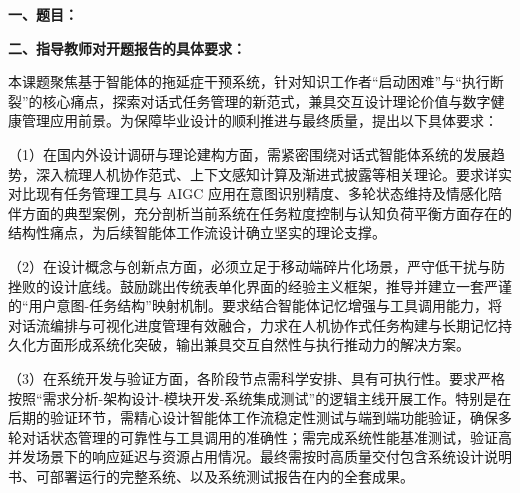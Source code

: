 {
    \setlength{\parindent}{0em}

    \par {\bfseries 一、题目：\uline{\hfill \Title \hfill}}

    \par {\bfseries 二、指导教师对开题报告的具体要求：}

    \setlength{\parindent}{2em}

    \par 本课题聚焦基于智能体的拖延症干预系统，针对知识工作者“启动困难”与“执行断裂”的核心痛点，探索对话式任务管理的新范式，兼具交互设计理论价值与数字健康管理应用前景。为保障毕业设计的顺利推进与最终质量，提出以下具体要求：

    \par （1）在国内外设计调研与理论建构方面，需紧密围绕对话式智能体系统的发展趋势，深入梳理人机协作范式、上下文感知计算及渐进式披露等相关理论。要求详实对比现有任务管理工具与 AIGC 应用在意图识别精度、多轮状态维持及情感化陪伴方面的典型案例，充分剖析当前系统在任务粒度控制与认知负荷平衡方面存在的结构性痛点，为后续智能体工作流设计确立坚实的理论支撑。

    \par （2）在设计概念与创新点方面，必须立足于移动端碎片化场景，严守低干扰与防挫败的设计底线。鼓励跳出传统表单化界面的经验主义框架，推导并建立一套严谨的“用户意图-任务结构”映射机制。要求结合智能体记忆增强与工具调用能力，将对话流编排与可视化进度管理有效融合，力求在人机协作式任务构建与长期记忆持久化方面形成系统化突破，输出兼具交互自然性与执行推动力的解决方案。
    
    \par （3）在系统开发与验证方面，各阶段节点需科学安排、具有可执行性。要求严格按照“需求分析-架构设计-模块开发-系统集成测试”的逻辑主线开展工作。特别是在后期的验证环节，需精心设计智能体工作流稳定性测试与端到端功能验证，确保多轮对话状态管理的可靠性与工具调用的准确性；需完成系统性能基准测试，验证高并发场景下的响应延迟与资源占用情况。最终需按时高质量交付包含系统设计说明书、可部署运行的完整系统、以及系统测试报告在内的全套成果。
}

\mbox{} \vfill

\signature{指导教师（签名）}

